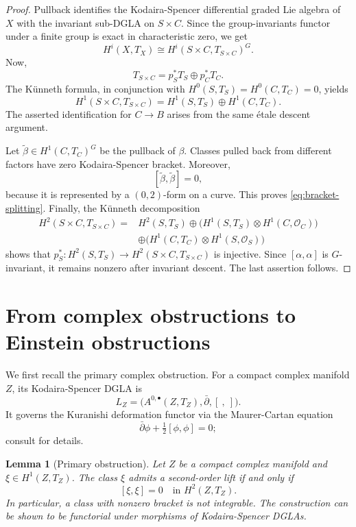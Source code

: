 \documentclass[10pt,a4paper]{amsart}
\numberwithin{equation}{section}
\newtheorem{lemma}[theorem]{Lemma}
\newcommand{\cO}{\mathcal{O}}
\newcommand{\dbar}{\bar\partial}
\newcommand{\half}{\tfrac12}
\begin{document}
\begin{proof}
Pullback identifies the Kodaira-Spencer differential graded Lie algebra of $X$ with the invariant sub-DGLA on $S\times C$. Since the group-invariants functor under a finite group is exact in characteristic zero, we get
$$H^i(X,T_X)\cong H^i(S\times C,T_{S\times C})^G.$$
Now,
$$T_{S\times C}=p_S^*T_S\oplus p_C^*T_C.$$
The K\"unneth formula, in conjunction with $H^0(S,T_S)=H^0(C,T_C)=0$, yields
$$H^1(S\times C,T_{S\times C})
=H^1(S,T_S)\oplus H^1(C,T_C).$$
The asserted identification for $C\to B$ arises from the same \'etale descent argument.

Let $\widetilde\beta\in H^1(C,T_C)^G$ be the pullback of $\beta$. Classes pulled back from different factors have zero Kodaira-Spencer bracket. Moreover,
$$[\widetilde\beta,\widetilde\beta]=0,$$
because it is represented by a $(0,2)$-form on a curve. This proves \eqref{eq:bracket-splitting}. Finally, the K\"unneth decomposition
\begin{align*}
H^2(S\times C,T_{S\times C})={}&H^2(S,T_S)
\oplus\bigl(H^1(S,T_S)\otimes H^1(C,\cO_C)\bigr)\\
&\oplus\bigl(H^1(C,T_C)\otimes H^1(S,\cO_S)\bigr)
\end{align*}
shows that $p_S^*\colon H^2(S,T_S)\to H^2(S\times C,T_{S\times C})$ is injective. Since $[\alpha,\alpha]$ is $G$-invariant, it remains nonzero after invariant descent. The last assertion follows.
\end{proof}


\section{From complex obstructions to Einstein obstructions}

We first recall the primary complex obstruction. For a compact complex manifold $Z$, its Kodaira-Spencer DGLA is
$$
L_Z=\bigl(A^{0,\bullet}(Z,T_Z),\dbar,[\ ,\ ]\bigr).$$
It governs the Kuranishi deformation functor via the Maurer-Cartan equation
$$\dbar\phi+\half[\phi,\phi]=0;$$
consult \cite{Kodaira,Kuranishi,ManettiDGLA,Sernesi}for details.

\begin{lemma}[Primary obstruction]\label{lem:primary}
Let $Z$ be a compact complex manifold and $\xi\in H^1(Z,T_Z)$. The class $\xi$ admits a second-order lift if and only if
$$[\xi,\xi]=0\quad\text{in }H^2(Z,T_Z).$$
In particular, a class with nonzero bracket is not integrable. The construction can be shown to be functorial under morphisms of Kodaira-Spencer DGLAs.
\end{lemma}
\end{document}
